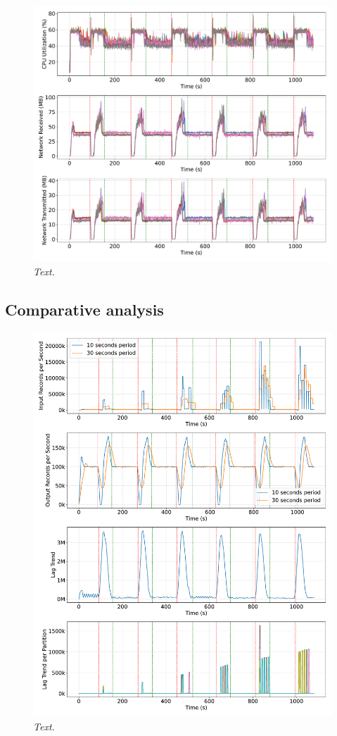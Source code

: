 \begin{figure}[ht]
    \centering
    \includegraphics[width=1\textwidth]{figures/flink-8pods/flink_8_pods_resources}
    \caption{\textit{Text.}}
    \label{fig:flink-8pods-resource}
\end{figure}


\subsection{Comparative analysis}\label{subsec:comparative-analysis}

\begin{figure}[ht]
    \centering
    \includegraphics[width=1\textwidth]{figures/flink-8pods/flink_8_pods_plot_impact}
    \caption{\textit{Text.}}
    \label{fig:kafka-flink-input}
\end{figure}

